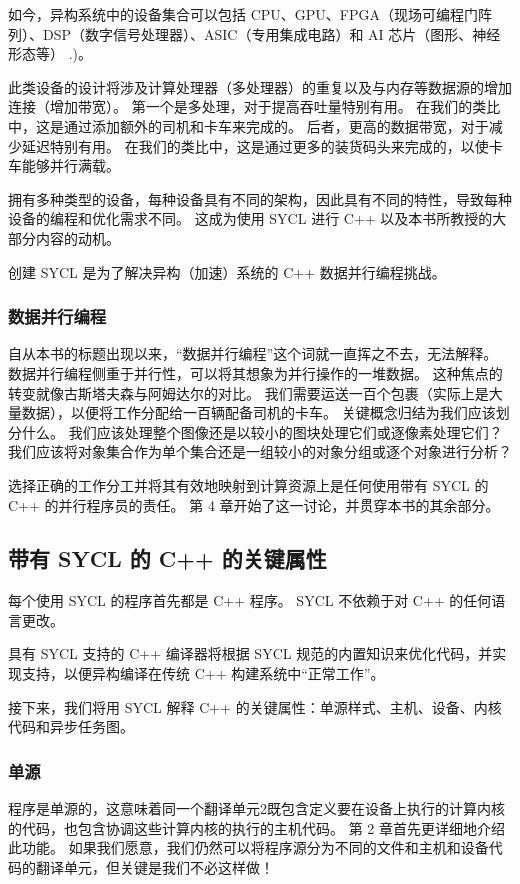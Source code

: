 如今，异构系统中的设备集合可以包括 CPU、GPU、FPGA（现场可编程门阵列）、DSP（数字信号处理器）、ASIC（专用集成电路）和 AI 芯片（图形、神经形态等） .)。

此类设备的设计将涉及计算处理器（多处理器）的重复以及与内存等数据源的增加连接（增加带宽）。 第一个是多处理，对于提高吞吐量特别有用。 在我们的类比中，这是通过添加额外的司机和卡车来完成的。 后者，更高的数据带宽，对于减少延迟特别有用。 在我们的类比中，这是通过更多的装货码头来完成的，以使卡车能够并行满载。

拥有多种类型的设备，每种设备具有不同的架构，因此具有不同的特性，导致每种设备的编程和优化需求不同。 这成为使用 SYCL 进行 C++ 以及本书所教授的大部分内容的动机。

\begin{remark}
	创建 SYCL 是为了解决异构（加速）系统的 C++ 数据并行编程挑战。
\end{remark}

\subsubsection{数据并行编程}

自从本书的标题出现以来，“数据并行编程”这个词就一直挥之不去，无法解释。 数据并行编程侧重于并行性，可以将其想象为并行操作的一堆数据。 这种焦点的转变就像古斯塔夫森与阿姆达尔的对比。 我们需要运送一百个包裹（实际上是大量数据），以便将工作分配给一百辆配备司机的卡车。 关键概念归结为我们应该划分什么。 我们应该处理整个图像还是以较小的图块处理它们或逐像素处理它们？ 我们应该将对象集合作为单个集合还是一组较小的对象分组或逐个对象进行分析？

选择正确的工作分工并将其有效地映射到计算资源上是任何使用带有 SYCL 的 C++ 的并行程序员的责任。 第 4 章开始了这一讨论，并贯穿本书的其余部分。

\subsection{带有 SYCL 的 C++ 的关键属性}
每个使用 SYCL 的程序首先都是 C++ 程序。 SYCL 不依赖于对 C++ 的任何语言更改。

具有 SYCL 支持的 C++ 编译器将根据 SYCL 规范的内置知识来优化代码，并实现支持，以便异构编译在传统 C++ 构建系统中“正常工作”。

接下来，我们将用 SYCL 解释 C++ 的关键属性：单源样式、主机、设备、内核代码和异步任务图。

\subsubsection{单源}
程序是单源的，这意味着同一个翻译单元2既包含定义要在设备上执行的计算内核的代码，也包含协调这些计算内核的执行的主机代码。 第 2 章首先更详细地介绍此功能。 如果我们愿意，我们仍然可以将程序源分为不同的文件和主机和设备代码的翻译单元，但关键是我们不必这样做！

